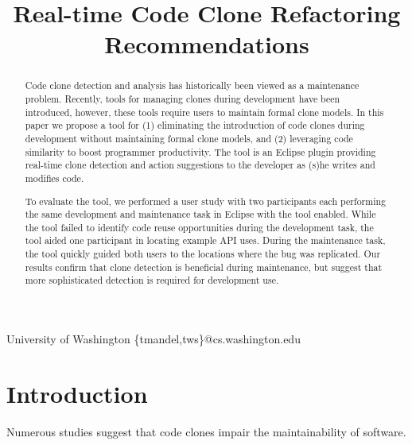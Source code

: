 \documentclass[nocopyrightspace,10pt]{sigplanconf}
\begin{document}
%

\title{Real-time Code Clone Refactoring Recommendations}
           {University of Washington}
           {\{tmandel,tws\}@cs.washington.edu}

\maketitle
\begin{abstract}
Code clone detection and analysis has historically been viewed as a
maintenance problem. Recently, tools for managing clones during
development have been introduced, however, these tools require
users to maintain formal clone models.
In this paper we propose a tool for (1) eliminating the
introduction of code clones during development without maintaining formal clone models, and (2) leveraging code
similarity to boost programmer productivity.
The tool
is an Eclipse plugin providing real-time clone detection and action
suggestions to the developer as (s)he writes and modifies
code. 

To evaluate the tool, we performed a user study with two participants
each performing the same development and maintenance task in Eclipse
with the tool enabled.  While the tool failed to identify code reuse
opportunities during the development task, the tool aided one
participant in locating example API uses. During the maintenance
task, the tool quickly guided both users to the locations where the
bug was replicated. Our results confirm that clone detection is
beneficial during maintenance, but suggest that more sophisticated
detection is required for development use.

\end{abstract}



\section{Introduction}
\label{sec:intro}
Numerous studies suggest that code clones impair the maintainability
of software.
\end{document}
